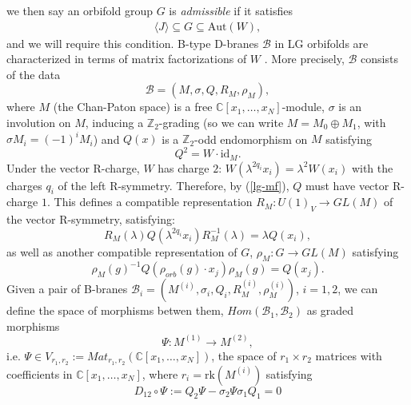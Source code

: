 \documentclass[a4paper,11pt]{article}
\numberwithin{equation}{section}
\begin{document}
we then say an orbifold group $G$ 
is \emph{admissible} if it satisfies
\begin{eqnarray}\label{Gadm}
\langle J\rangle\subseteq G\subseteq \mathrm{Aut}(W),
\end{eqnarray}
and we will require this condition. B-type D-branes $\mathcal{B}$ in LG 
orbifolds are characterized in terms of matrix factorizations of $W$ 
\cite{Kapustin:2002bi,Brunner:2003dc}. More precisely, $\mathcal{B}$ consists 
of the data 
\begin{equation}\label{mfbbb}
\mathcal{B}=(M,\sigma,Q,R_{M},\rho_{M}),
\end{equation}
where $M$ (the Chan-Paton space) is a free 
$\mathbb{C}[x_{1},\ldots,x_{N}]$-module, $\sigma$ is an involution on 
$M$, inducing a $\mathbb{Z}_2$-grading (so we can write 
$M=M_{0}\oplus M_{1}$, with $\sigma 
M_{i}=(-1)^{i}M_{i}$) and $Q(x)$ is a 
$\mathbb{Z}_2$-odd endomorphism on $M$ satisfying
\begin{equation}
  \label{lg-mf}
  Q^2=W\cdot\mathrm{id}_{M}.
\end{equation}
Under the vector R-charge, $W$ has 
charge $2$: $W(\lambda^{2q_i}x_i)=\lambda^2W(x_i)$ with the charges $q_i$ 
of the left R-symmetry. Therefore, by 
(\ref{lg-mf}), $Q$ must have vector R-charge $1$. This defines a 
compatible representation $R_{M}:U(1)_{V}\rightarrow GL(M)$ of 
the vector R-symmetry, satisfying:
\begin{equation}
 R_{M}(\lambda)Q(\lambda^{2q_i}x_i)R_{M}^{-1}
(\lambda)=\lambda Q(x_i),
\end{equation}
as well as another compatible representation of $G$, 
$\rho_{M}:G\rightarrow GL(M)$ satisfying
\begin{equation}
  \label{def-orbmat}
  \rho_{M}(g)^{-1}Q(\rho_{orb}(g)\cdot x_j)\rho_{M}(g)=Q
(x_ {j} ).
\end{equation}
Given a pair of B-branes 
$\mathcal{B}_{i}=(M^{(i)},\sigma_{i},Q_{i},R^{(i)}_{M},\rho^{(i)}_{M})$, 
$i=1,2$, we can define the space of morphisms betwen them, 
$Hom(\mathcal{B}_{1},\mathcal{B}_{2})$ as graded morphisms
\begin{equation}
 \Psi:M^{(1)}\rightarrow M^{(2)},
\end{equation}
i.e. $\Psi\in 
V_{r_{1},r_{2}}:=Mat_{r_{1},r_{2}}(\mathbb{C}[x_{1},\ldots,x_{N}])$, the space 
of $r_{1}\times r_{2}$ matrices with coefficients in 
$\mathbb{C}[x_{1},\ldots,x_{N}]$, where $r_{i}=\mathrm{rk}(M^{(i)})$ satisfying
\begin{equation}
D_{12}\circ\Psi:= Q_{2}\Psi-\sigma_{2}\Psi\sigma_{1} Q_{1}=0
\end{equation}
\end{document}
